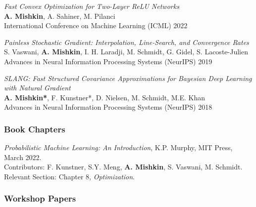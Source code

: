 \begin{description}[leftmargin=\mleftsize,style=nextline,font=\normalfont\space]
    \textit{Fast Convex Optimization for Two-Layer ReLU Networks}\\
    {\bf A. Mishkin}, A. Sahiner, M. Pilanci\\
    International Conference on Machine Learning (ICML) 2022

    \textit{Painless Stochastic Gradient: Interpolation, Line-Search, and Convergence Rates}\\
    S. Vaswani, {\bf A. Mishkin}, I. H. Laradji, M. Schmidt, G. Gidel, S. Lacoste-Julien\\
    Advances in Neural Information Processing Systems (NeurIPS) 2019

    \textit{SLANG: Fast Structured Covariance Approximations for Bayesian Deep Learning with Natural Gradient}\\
    {\bf A. Mishkin*}, F. Kunstner*, D. Nielsen, M. Schmidt, M.E. Khan\\
    Advances in Neural Information Processing Systems (NeurIPS) 2018
\end{description}

\vspace{1ex}

\subsubsection{Book Chapters}

\begin{description}[leftmargin=\mleftsize,style=nextline,font=\normalfont\space]
    \textit{Probabilistic Machine Learning: An Introduction}, K.P. Murphy, MIT Press, March 2022.\\
    Contributors: F. Kunstner, S.Y. Meng, \textbf{A. Mishkin}, S. Vaswani, M. Schmidt.\\
    Relevant Section: Chapter 8, \textit{Optimization}.
\end{description}

\vspace{1ex}

\subsubsection{Workshop Papers}

